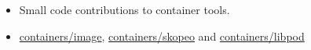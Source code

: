 \documentclass[10pt,a4paper]{altacv}
\begin{document}
\begin{itemize}
\item Small code contributions to container tools.
\item \href{https://github.com/containers/image/commits?author=jvanz}{containers/image},  \href{https://github.com/containers/skopeo/commits?author=jvanz}{containers/skopeo} and \href{https://github.com/containers/libpod/commits?author=jvanz}{containers/libpod}
\end{itemize}


\clearpage
\end{document}
